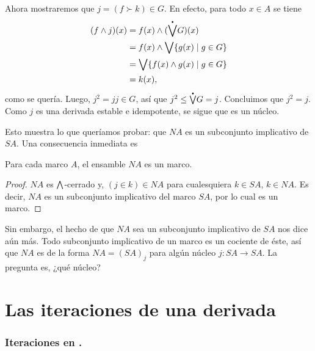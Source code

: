 Ahora mostraremos que $j=(f\succ k)\in G$.
En efecto, para todo $x\in A$ se tiene
\begin{align*}
  (f\inf j)(x)
  &= f(x) \inf (\pSup G)(x) \\
  &= f(x) \inf \Sup\{g(x) \mid g\in G\} \\
  &= \Sup\{f(x) \inf g(x) \mid g\in G\} \\
  &= k(x),
\end{align*}
como se quería.
Luego, $j^2=jj\in G$, así que $j^2\leq\pSup G = j$.
Concluimos que $j^2=j$.
Como $j$ es una derivada estable e idempotente,
se sigue que es un núcleo.

Esto muestra lo que queríamos probar: que $NA$ es un subconjunto
implicativo de $SA$.
Una consecuencia inmediata es

\begin{thm}
  Para cada marco $A$, el ensamble $NA$ es un marco.
\end{thm}
\begin{proof}
    $NA$ es $\bigwedge$-cerrado y, $(j\in k)\in NA$ para cualesquiera
    $k\in SA$, $k\in NA$.
    Es decir, $NA$ es un subconjunto implicativo del marco $SA$,
    por lo cual es un marco.
\end{proof}
Sin embargo, el hecho de que $NA$ sea un subconjunto
implicativo de $SA$ nos dice aún más.
Todo subconjunto implicativo de un marco es un cociente de éste,
así que $NA$ es de la forma $NA=(SA)_j$ para algún núcleo
$j:SA\to SA$.
La pregunta es, ¿qué núcleo?

\section{Las iteraciones de una derivada}
\subsubsection{Iteraciones en .}

